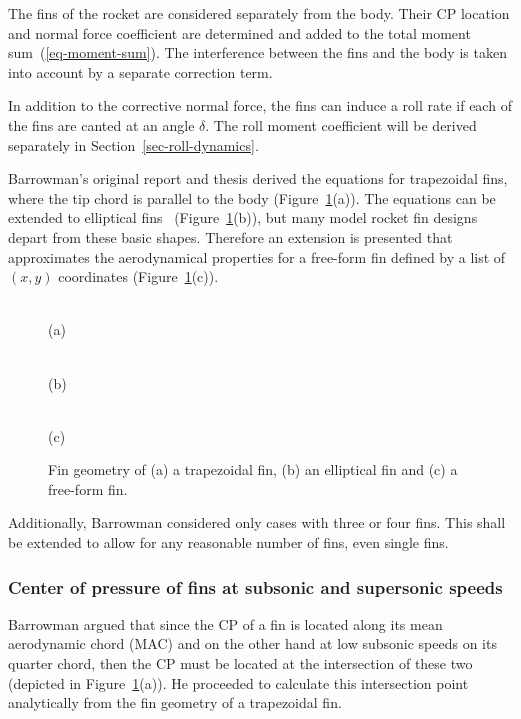 The fins of the rocket are considered separately from the body.  Their
CP location and normal force coefficient are determined and added to
the total moment sum~(\ref{eq-moment-sum}).  The interference between
the fins and the body is taken into account by a separate correction
term.

In addition to the corrective normal force, the fins can induce a roll
rate if each of the fins are canted at an angle $\delta$.  The roll
moment coefficient will be derived separately in
Section~\ref{sec-roll-dynamics}.

Barrowman's original report and thesis derived the equations for
trapezoidal fins, where the tip chord is parallel to the body
(Figure~\ref{fig-fin-geometry}(a)).  The equations can be extended to
\eg elliptical fins~\cite{barrowman-elliptical-fins}
(Figure~\ref{fig-fin-geometry}(b)), but many model rocket fin
designs depart from these basic shapes.  Therefore an
extension is presented that approximates the aerodynamical
properties for a free-form fin defined by a list of $(x,y)$
coordinates (Figure~\ref{fig-fin-geometry}(c)). 


\begin{figure}
\centering
\parbox{35mm}{\centering
{} \\ (a)}
\hfill
\parbox{35mm}{\centering
{} \\ (b)}
\hfill
\parbox{35mm}{\centering
{} \\ (c)}
\caption{Fin geometry of (a) a trapezoidal fin, (b) an elliptical fin
  and (c) a free-form fin.}
\label{fig-fin-geometry}
\end{figure}



Additionally, Barrowman considered only cases with three or four
fins.  This shall be extended to allow for any reasonable number of
fins, even single fins.


\subsubsection{Center of pressure of fins at subsonic and supersonic
  speeds}

Barrowman argued that since the CP of a fin is located along its mean
aerodynamic chord (MAC) and on the other hand at low subsonic speeds
on its quarter chord, then the CP must be located at the intersection
of these two (depicted in Figure~\ref{fig-fin-geometry}(a)).  He
proceeded to calculate this intersection point analytically from the
fin geometry of a trapezoidal fin.

